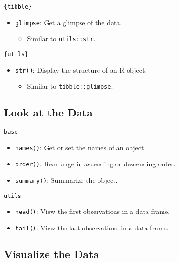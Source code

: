 \documentclass[]{book}
\providecommand{\tightlist}{%
  \setlength{\itemsep}{0pt}\setlength{\parskip}{0pt}}
\begin{document}
\texttt{\{tibble\}}

\begin{itemize}
\tightlist
\item
  \texttt{glimpse}: Get a glimpse of the data.

  \begin{itemize}
  \tightlist
  \item
    Similar to \texttt{utils::str}.
  \end{itemize}
\end{itemize}

\texttt{\{utils\}}

\begin{itemize}
\tightlist
\item
  \texttt{str()}: Display the structure of an R object.

  \begin{itemize}
  \tightlist
  \item
    Similar to \texttt{tibble::glimpse}.
  \end{itemize}
\end{itemize}

\hypertarget{look-at-the-data}{%
\subsection{Look at the Data}\label{look-at-the-data}}

\texttt{base}

\begin{itemize}
\tightlist
\item
  \texttt{names()}: Get or set the names of an object.
\item
  \texttt{order()}: Rearrange in ascending or descending order.
\item
  \texttt{summary()}: Summarize the object.
\end{itemize}

\texttt{utils}

\begin{itemize}
\tightlist
\item
  \texttt{head()}: View the first observations in a data frame.
\item
  \texttt{tail()}: View the last observations in a data frame.
\end{itemize}

\hypertarget{visualize-the-data}{%
\subsection{Visualize the Data}\label{visualize-the-data}}
\end{document}
